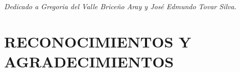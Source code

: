 \documentclass[letterpaper,titlepage,12pt,oneside,spanish,final]{report_eie}
\begin{document}




\begin{figure}
        \begin{center}

        \vspace{0.5mm}
        \label{Fig.aprobacion}
        \end{center}
        \end{figure}
\thispagestyle{empty}

\newpage

\begin{figure}
        \begin{center}
        \vspace{0.5mm}
        \label{Fig.mencion}
        \end{center}
\end{figure}
\thispagestyle{empty}

\newpage%
\newenvironment{dedication}%
{\cleardoublepage \thispagestyle{empty} %
\begin{center} \em} {\end{center} \vspace*{\stretch{3}} }%
\begin{dedication}%
Dedicado a Gregoria del Valle Briceño Aray y José Edmundo Tovar Silva.
\end{dedication}%

\chapter*{RECONOCIMIENTOS Y AGRADECIMIENTOS}
%
\end{document}
